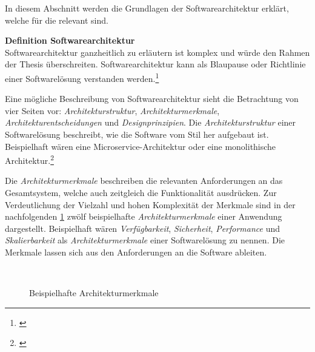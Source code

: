 In diesem Abschnitt werden die Grundlagen der Softwarearchitektur erklärt, welche für die \dokumententyp{} relevant sind. 

\textbf{Definition Softwarearchitektur}\\
Softwarearchitektur ganzheitlich zu erläutern ist komplex und würde den Rahmen der Thesis überschreiten. Softwarearchitektur kann als Blaupause oder Richtlinie einer Softwarelösung verstanden werden.\footnote{\cite[vgl.][15]{Ford2020}}

Eine mögliche Beschreibung von Softwarearchitektur sieht die Betrachtung von vier Seiten vor: \textit{Architekturstruktur}, \textit{Architekturmerkmale}, \textit{Architekturentscheidungen} und \textit{Designprinzipien}. Die \textit{Architekturstruktur} einer Softwarelösung beschreibt, wie die Software vom Stil her aufgebaut ist. Beispielhaft wären eine Microservice-Architektur oder eine monolithische Architektur.\footnote{\cite[vgl.][15]{Ford2020}}

Die \textit{Architekturmerkmale} beschreiben die relevanten Anforderungen an das Gesamtsystem, welche auch zeitgleich die Funktionalität ausdrücken. Zur Verdeutlichung der Vielzahl und hohen Komplexität der Merkmale sind in der nachfolgenden \cref{fig:ArchitectureCharacteristics} zwölf beispielhafte \textit{Architekturmerkmale} einer Anwendung dargestellt. Beispielhaft wären \textit{Verfügbarkeit}, \textit{Sicherheit}, \textit{Performance} und \textit{Skalierbarkeit} als \textit{Architekturmerkmale} einer Softwarelösung zu nennen. Die Merkmale lassen sich aus den Anforderungen an die Software ableiten. 

\newpage
\begin{figure}[hbt!]
	\centering
	\begin{minipage}[t]{0.5\textwidth}	
		\caption{Beispielhafte Architekturmerkmale}
		\\ %
		\label{fig:ArchitectureCharacteristics}
	\end{minipage}
\end{figure}

